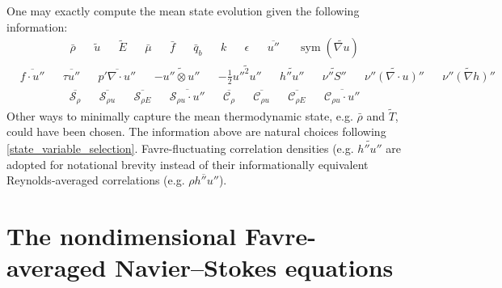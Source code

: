 \documentclass[letterpaper,11pt,nointlimits,reqno,draft]{amsbook}
\newcommand{\symmetricpart}[1]
  {\ensuremath{\operatorname{sym}\left(#1\right)}}
\newcommand{\Ssd}{\ensuremath{\mathcal{S}}} %
\newcommand{\Cs}{\ensuremath{\mathcal{C}}}  %
\begin{document}
One may exactly compute the mean state evolution given the following
information:
\begin{align}
&\bar{\rho}
&
&\tilde{u}
&
&\tilde{E}
&
&\bar{\mu}
&
&\bar{f}
&
&\bar{q}_b
&
&k
&
&\epsilon
&
&\overline{u''}
&
&\symmetricpart{\widetilde{\nabla{}u}}
\end{align}
\begin{align}
&\overline{f\cdot{}u''}
&
&\overline{\tau{}u''}
&
&\overline{p'\nabla\cdot{}u''}
&
&-\widetilde{u''\otimes{}u''}
&
&-\frac{1}{2}\widetilde{{u''}^{2}u''}
&
&\widetilde{h''u''}
&
&\widetilde{\nu''S''}
&
&\widetilde{\nu''\left(\nabla\cdot{}u\right)''}
&
&\widetilde{\nu''\left(\nabla{}h\right)''}
\end{align}
\begin{align}
&\overline{\Ssd_{\rho{}}}
&
&\overline{\Ssd_{\rho{} u}}
&
&\overline{\Ssd_{\rho{} E}}
&
&\overline{\Ssd_{\rho{} u}\cdot{}u''}
&
&\overline{\Cs_{\rho{}}}
&
&\overline{\Cs_{\rho{} u}}
&
&\overline{\Cs_{\rho{} E}}
&
&\overline{\Cs_{\rho{} u}\cdot{}u''}
\end{align}
Other ways to minimally capture the mean thermodynamic state, e.g. $\bar{\rho}$
and $\tilde{T}$, could have been chosen.  The information above are natural
choices following \autoref{state_variable_selection}.  Favre-fluctuating
correlation densities (e.g.  $\widetilde{h''u''}$ are adopted for notational
brevity instead of their informationally equivalent Reynolds-averaged
correlations (e.g.  $\overline{\rho{}h''u''}$).

\section{The nondimensional Favre-averaged Navier--Stokes equations}
\label{sec:nondimfans}
\end{document}

